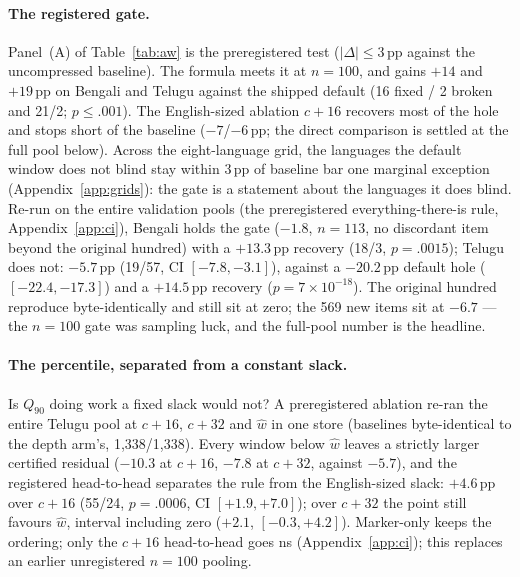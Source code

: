 \documentclass{article}
\begin{document}
\paragraph{The registered gate.}
Panel~(A) of Table~\ref{tab:aw} is the preregistered test
($|\Delta|\le 3$\,pp against the uncompressed baseline). The formula
meets it at $n{=}100$, and gains $+14$ and $+19$\,pp on Bengali
and Telugu against the shipped default (16 fixed / 2 broken and 21/2;
$p{\le}.001$). The
English-sized ablation $c{+}16$ recovers most of the hole and stops
short of the baseline ($-7$/$-6$\,pp; the direct comparison is
settled at the full pool below). Across the eight-language grid, the
languages the default window does not blind stay within $3$\,pp of
baseline bar one marginal exception (Appendix~\ref{app:grids}): the
gate is a statement about the languages it does blind.
Re-run on the entire validation pools (the preregistered
everything-there-is rule, Appendix~\ref{app:ci}), Bengali
holds the gate ($-1.8$, $n{=}113$, no discordant item beyond the
original hundred) with a $+13.3$\,pp recovery (18/3, $p{=}.0015$);
Telugu does not: $-5.7$\,pp (19/57, CI $[-7.8,-3.1]$),
against a $-20.2$\,pp default hole ($[-22.4,-17.3]$) and a
$+14.5$\,pp recovery ($p{=}7{\times}10^{-18}$). The original hundred reproduce byte-identically and still sit at
zero; the 569 new items sit at $-6.7$ --- the $n{=}100$ gate was
sampling luck, and the full-pool number is the headline.

\paragraph{The percentile, separated from a constant slack.}
Is $Q_{90}$ doing work a fixed slack would not? A preregistered
ablation re-ran the entire Telugu pool at $c{+}16$, $c{+}32$ and
$\hat w$ in one store (baselines byte-identical to the depth arm's,
1{,}338/1{,}338). Every window below
$\hat w$ leaves a strictly larger certified residual ($-10.3$ at
$c{+}16$, $-7.8$ at $c{+}32$, against $-5.7$), and the registered
head-to-head separates the rule from the English-sized slack:
$+4.6$\,pp over $c{+}16$ (55/24, $p{=}.0006$, CI $[+1.9,+7.0]$);
over $c{+}32$ the point still favours $\hat w$, interval including
zero ($+2.1$, $[-0.3,+4.2]$). Marker-only keeps the ordering; only the
$c{+}16$ head-to-head goes ns (Appendix~\ref{app:ci}); this
replaces an earlier unregistered $n{=}100$ pooling.
\end{document}

